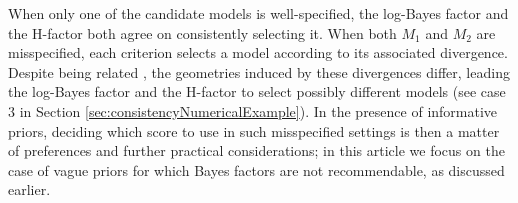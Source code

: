 \documentclass[12pt]{article}
\theoremstyle{plain}
\theoremstyle{definition}
\begin{document}
	When only one of the candidate models is well-specified, the log-Bayes factor
	and the H-factor both agree on consistently selecting it. When both $M_1$ and $M_2$ are misspecified, each criterion selects a
	model according to its associated divergence. Despite being related
	\citep[e.g.\! ][and references therein]{bobkov2014bounds}, the geometries
	induced by these divergences differ, leading the log-Bayes
	factor and the H-factor to select possibly different models (see case 3 in
	Section \ref{sec:consistencyNumericalExample}). In the presence of informative priors,
	deciding which score to use in such misspecified settings is
	then a matter of preferences and further practical considerations; in this article
	we focus on the case of vague priors for which Bayes factors are not recommendable,
	as discussed earlier.
	
\end{document}
